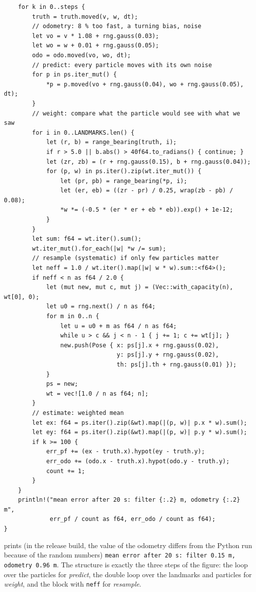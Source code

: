 \begin{verbatim}
    for k in 0..steps {
        truth = truth.moved(v, w, dt);
        // odometry: 8 % too fast, a turning bias, noise
        let vo = v * 1.08 + rng.gauss(0.03);
        let wo = w + 0.01 + rng.gauss(0.05);
        odo = odo.moved(vo, wo, dt);
        // predict: every particle moves with its own noise
        for p in ps.iter_mut() {
            *p = p.moved(vo + rng.gauss(0.04), wo + rng.gauss(0.05), dt);
        }
        // weight: compare what the particle would see with what we saw
        for i in 0..LANDMARKS.len() {
            let (r, b) = range_bearing(truth, i);
            if r > 5.0 || b.abs() > 40f64.to_radians() { continue; }
            let (zr, zb) = (r + rng.gauss(0.15), b + rng.gauss(0.04));
            for (p, w) in ps.iter().zip(wt.iter_mut()) {
                let (pr, pb) = range_bearing(*p, i);
                let (er, eb) = ((zr - pr) / 0.25, wrap(zb - pb) / 0.08);
                *w *= (-0.5 * (er * er + eb * eb)).exp() + 1e-12;
            }
        }
        let sum: f64 = wt.iter().sum();
        wt.iter_mut().for_each(|w| *w /= sum);
        // resample (systematic) if only few particles matter
        let neff = 1.0 / wt.iter().map(|w| w * w).sum::<f64>();
        if neff < n as f64 / 2.0 {
            let (mut new, mut c, mut j) = (Vec::with_capacity(n), wt[0], 0);
            let u0 = rng.next() / n as f64;
            for m in 0..n {
                let u = u0 + m as f64 / n as f64;
                while u > c && j < n - 1 { j += 1; c += wt[j]; }
                new.push(Pose { x: ps[j].x + rng.gauss(0.02),
                                y: ps[j].y + rng.gauss(0.02),
                                th: ps[j].th + rng.gauss(0.01) });
            }
            ps = new;
            wt = vec![1.0 / n as f64; n];
        }
        // estimate: weighted mean
        let ex: f64 = ps.iter().zip(&wt).map(|(p, w)| p.x * w).sum();
        let ey: f64 = ps.iter().zip(&wt).map(|(p, w)| p.y * w).sum();
        if k >= 100 {
            err_pf += (ex - truth.x).hypot(ey - truth.y);
            err_odo += (odo.x - truth.x).hypot(odo.y - truth.y);
            count += 1;
        }
    }
    println!("mean error after 20 s: filter {:.2} m, odometry {:.2} m",
             err_pf / count as f64, err_odo / count as f64);
}
\end{verbatim}
prints (in the release build, the value of the odometry differs from the Python run because of the random numbers) \verb!mean error after 20 s: filter 0.15 m, odometry 0.96 m!. The structure is exactly the three steps of the figure: the loop over the particles for \emph{predict}, the double loop over the landmarks and particles for \emph{weight}, and the block with \verb!neff! for \emph{resample}.

